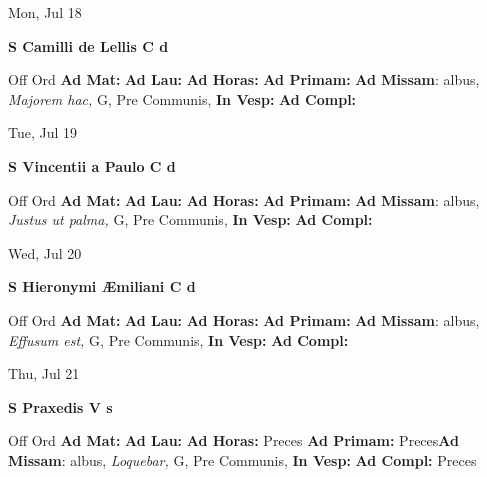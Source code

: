 \documentclass[10pt]{memoir}
\begin{document}
\begin{center}
\begin{minipage}{3.5in}
\vspace{2em}
\begin{center}Mon, Jul 18
\end{center}
\textbf{ \large S Camilli de Lellis C
\textnormal{\normalsize d}}

\begin{justify}Off Ord
\textbf{Ad Mat: }
\textbf{Ad Lau: }
\textbf{Ad Horas: }
\textbf{Ad Primam: }\textbf{Ad Missam}: albus, \textit{Majorem hac,} G, Pre Communis, 
\textbf{In Vesp: }
\textbf{Ad Compl: }
\end{justify}
\end{minipage}
\end{center}

\begin{center}
\begin{minipage}{3.5in}
\vspace{2em}
\begin{center}Tue, Jul 19
\end{center}
\textbf{ \large S Vincentii a Paulo C
\textnormal{\normalsize d}}

\begin{justify}Off Ord
\textbf{Ad Mat: }
\textbf{Ad Lau: }
\textbf{Ad Horas: }
\textbf{Ad Primam: }\textbf{Ad Missam}: albus, \textit{Justus ut palma,} G, Pre Communis, 
\textbf{In Vesp: }
\textbf{Ad Compl: }
\end{justify}
\end{minipage}
\end{center}

\begin{center}
\begin{minipage}{3.5in}
\vspace{2em}
\begin{center}Wed, Jul 20
\end{center}
\textbf{ \large S Hieronymi Æmiliani C
\textnormal{\normalsize d}}

\begin{justify}Off Ord
\textbf{Ad Mat: }
\textbf{Ad Lau: }
\textbf{Ad Horas: }
\textbf{Ad Primam: }\textbf{Ad Missam}: albus, \textit{Effusum est,} G, Pre Communis, 
\textbf{In Vesp: }
\textbf{Ad Compl: }
\end{justify}
\end{minipage}
\end{center}

\begin{center}
\begin{minipage}{3.5in}
\vspace{2em}
\begin{center}Thu, Jul 21
\end{center}
\textbf{ \large S Praxedis V
\textnormal{\normalsize s}}

\begin{justify}Off Ord
\textbf{Ad Mat: }
\textbf{Ad Lau: }
\textbf{Ad Horas: }Preces
\textbf{Ad Primam: }Preces\textbf{Ad Missam}: albus, \textit{Loquebar,} G, Pre Communis, 
\textbf{In Vesp: }
\textbf{Ad Compl: }Preces
\end{justify}
\end{minipage}
\end{center}
\end{document}
